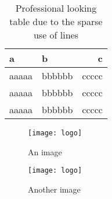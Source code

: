 \begin{table}[h!]
	\centering
	\begin{tabular}{llr}
		\hline
		a & b & c \\
		\hline
		aaaaa & bbbbbb & ccccc \\
		aaaaa & bbbbbb & ccccc \\
		aaaaa & bbbbbb & ccccc \\
		\hline
	\end{tabular}
	\caption{Professional looking table due to the sparse use of lines }
	\label{tab:test}
\end{table}

\begin{figure}[h]
  \centering
  \texttt{[image: logo]}
  \caption{An image}
  \label{fig:testimage}
\end{figure}


\begin{figure}
  \centering
  \texttt{[image: logo]}
  \caption{Another image}
  \label{fig:testimage}
\end{figure}


%

%
%

